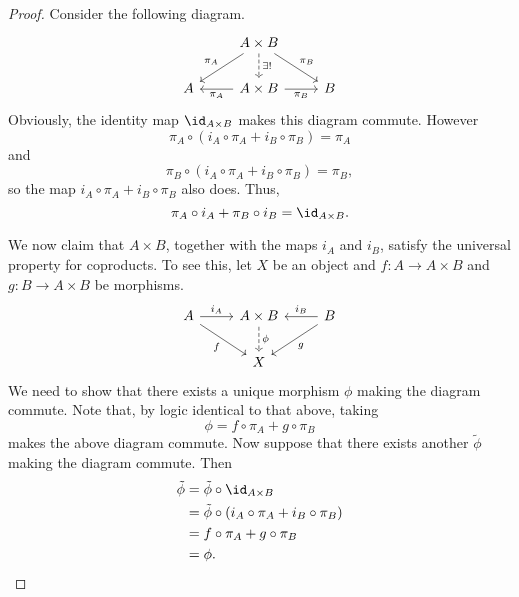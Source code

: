 \documentclass[main.tex]{subfiles}
\begin{document}
\begin{proof}
  Consider the following diagram.
  \begin{equation*}
    \begin{tikzcd}
      & A \times B
      \arrow[dr, "\pi_{B}"]
      \arrow[dl, swap, "\pi_{A}"]
      \arrow[d, dashed, "\exists!"]
      \\
      A
      & A \times B
      \arrow[r, swap, "\pi_{B}"]
      \arrow[l, "\pi_{A}"]
      & B
    \end{tikzcd}
  \end{equation*}
  Obviously, the identity map $\id_{A \times B}$ makes this diagram commute. However
  \begin{equation*}
    \pi_{A} \circ (i_{A} \circ \pi_{A} + i_{B} \circ \pi_{B}) = \pi_{A}
  \end{equation*}
  and
  \begin{equation*}
    \pi_{B} \circ (i_{A} \circ \pi_{A} + i_{B} \circ \pi_{B}) = \pi_{B},
  \end{equation*}
  so the map $i_{A} \circ \pi_{A} + i_{B} \circ \pi_{B}$ also does. Thus,
  \begin{equation*}
    \pi_{A} \circ i_{A} + \pi_{B} \circ i_{B} = \id_{A \times B}.
  \end{equation*}

  We now claim that $A \times B$, together with the maps $i_{A}$ and $i_{B}$, satisfy the universal property for coproducts. To see this, let $X$ be an object and $f\colon A \to A \times B$ and $g\colon B \to A \times B$ be morphisms.
  \begin{equation*}
    \begin{tikzcd}
      A
      \arrow[r, "i_{A}"]
      \arrow[dr, swap, "f"]
      & A \times B
      \arrow[d, dashed, "\phi"]
      & B
      \arrow[l, swap, "i_{B}"]
      \arrow[dl, "g"]
      \\
      & X
    \end{tikzcd}
  \end{equation*}
  We need to show that there exists a unique morphism $\phi$ making the diagram commute. Note that, by logic identical to that above, taking
  \begin{equation*}
    \phi = f \circ \pi_{A} + g \circ \pi_{B}
  \end{equation*}
  makes the above diagram commute. Now suppose that there exists another $\tilde{\phi}$ making the diagram commute. Then
  \begin{align*}
    \tilde{\phi} &= \tilde{\phi} \circ \id_{A \times B} \\
    &= \tilde{\phi} \circ (i_{A} \circ \pi_{A} + i_{B} \circ \pi_{B}) \\
    &= f \circ \pi_{A} + g \circ \pi_{B} \\
    &= \phi.
  \end{align*}
\end{proof}
\end{document}
